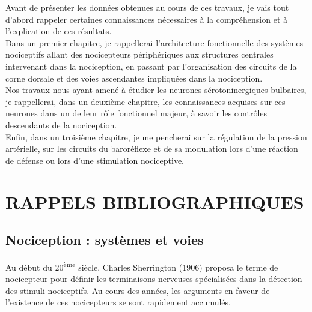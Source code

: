 \documentclass[a4paper,12pt,twoside]{report}
\begin{document}
\bigskip

Avant de présenter les données obtenues au cours de ces travaux, je vais tout d’abord rappeler certaines connaissances nécessaires à la compréhension et à l’explication de ces résultats.\\
Dans un premier chapitre, je rappellerai l’architecture fonctionnelle des systèmes nociceptifs allant des nocicepteurs périphériques aux structures centrales intervenant dans la nociception, en passant par l’organisation des circuits de la corne dorsale et des voies ascendantes impliquées dans la nociception.\\
Nos travaux nous ayant amené à étudier les neurones sérotoninergiques bulbaires, je rappellerai, dans un deuxième chapitre, les connaissances acquises sur ces neurones dans un de leur rôle fonctionnel majeur, à savoir les contrôles descendants de la nociception.\\
Enfin, dans un troisième chapitre, je me pencherai sur la régulation de la pression artérielle, sur les circuits du baroréflexe et de sa modulation lors d’une réaction de défense ou lors d’une stimulation \nolinebreak[4] nociceptive.

\cleardoublepage

\fancyhf{} %
\fancyfoot[C]{\bfseries -\thepage-}
\fancyhead[RO]{\bfseries\rightmark}
\fancyhead[LE]{\bfseries\leftmark}
\renewcommand{\headrulewidth}{1pt}
\renewcommand{\footrulewidth}{1pt}
\addtolength{\headheight}{1pt} %

\fancypagestyle{plain}{%
\fancyhead{} %
\renewcommand{\headrulewidth}{0pt} %
\renewcommand{\footrulewidth}{0pt}
\fancyfoot[C]{\bfseries -\thepage-}%
%
}

\part{RAPPELS BIBLIOGRAPHIQUES}

\cleardoublepage

\chapter{Nociception : systèmes et voies}

Au début du 20\textsuperscript{ème} siècle, Charles Sherrington (1906) proposa le terme de nocicepteur pour définir les terminaisons nerveuses spécialisées dans la détection des stimuli nociceptifs. Au cours des années, les arguments en faveur de l’existence de ces nocicepteurs se sont rapidement accumulés. 
\end{document}
